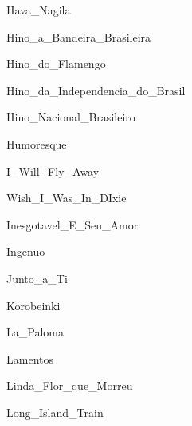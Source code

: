 \documentclass{scrartcl}
\begin{document}

{Hava_Nagila}


{Hino_a_Bandeira_Brasileira}


{Hino_do_Flamengo}


{Hino_da_Independencia_do_Brasil}


{Hino_Nacional_Brasileiro}


{Humoresque}


{I_Will_Fly_Away}


{Wish_I_Was_In_DIxie}


{Inesgotavel_E_Seu_Amor}


{Ingenuo}


{Junto_a_Ti}


{Korobeinki}


{La_Paloma}


{Lamentos}


{Linda_Flor_que_Morreu}


{Long_Island_Train}
\end{document}

